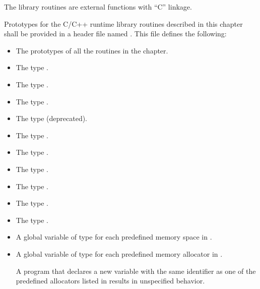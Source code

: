 \begin{ccppspecific}
The library routines are external functions with ``C'' linkage.

Prototypes for the C/C++ runtime library routines described in this chapter shall be
provided in a header file named . This file defines the following:

\begin{itemize}
\item The prototypes of all the routines in the chapter.

\item The type .

\item The type .

\item The type .

\item The type  (deprecated).

\item The type .

\item The type .

\item The type .

\item The type .

\item The type .

\item The type .

\item A global variable of type  for each predefined memory space in .

\item A global variable of type  for each predefined memory allocator in .

A program that declares a new variable with the same identifier as one of the predefined allocators listed in  results in unspecified behavior.

\end{itemize}


\end{ccppspecific}


